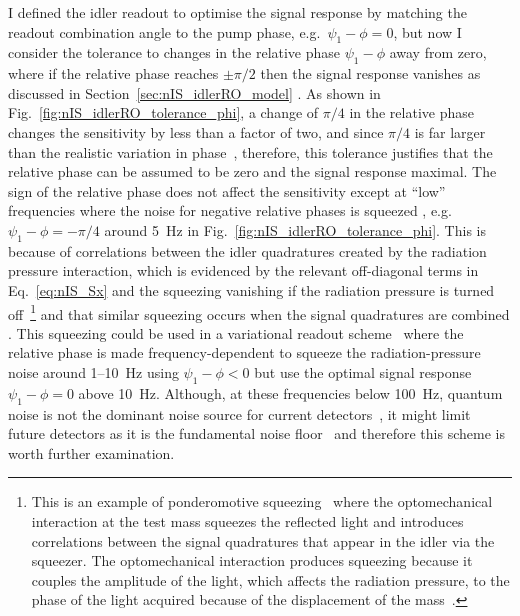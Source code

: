 I defined the idler readout to optimise the signal response by matching the readout combination angle to the pump phase, e.g.\ $\psi_1-\phi=0$, but now I consider the tolerance to changes in the relative phase $\psi_1-\phi$ away from zero, where if the relative phase reaches $\pm\pi/2$ then the signal response vanishes as discussed in Section~\ref{sec:nIS_idlerRO_model} .
As shown in Fig.~\ref{fig:nIS_idlerRO_tolerance_phi}, a change of $\pi/4$ in the relative phase changes the sensitivity by less than a factor of two, and since $\pi/4$ is far larger than the realistic variation in phase~\cite{}, therefore, this tolerance justifies that the relative phase can be assumed to be zero and the signal response maximal. %
The sign of the relative phase does not affect the sensitivity except at ``low'' frequencies where the noise for negative relative phases is squeezed , e.g.\ $\psi_1-\phi=-\pi/4$ around 5~Hz in Fig.~\ref{fig:nIS_idlerRO_tolerance_phi}. This is because of correlations between the idler quadratures created by the radiation pressure interaction, which is evidenced by the relevant off-diagonal terms in Eq.~\ref{eq:nIS_Sx} and the squeezing vanishing if the radiation pressure is turned off~\footnote{This is an example of ponderomotive squeezing~\cite{} where the optomechanical interaction at the test mass squeezes the reflected light and introduces correlations between the signal quadratures that appear in the idler via the squeezer. The optomechanical interaction produces squeezing because it couples the amplitude of the light, which affects the radiation pressure, to the phase of the light acquired because of the displacement of the mass~\cite{}. } and that similar squeezing occurs when the signal quadratures are combined .
This squeezing could be used in a variational readout scheme~\cite{MiaoCQC?} where the relative phase is made frequency-dependent to squeeze the radiation-pressure noise around 1--10~Hz using $\psi_1-\phi<0$ but use the optimal signal response $\psi_1-\phi=0$ above 10~Hz. Although, at these frequencies below 100~Hz, quantum noise is not the dominant noise source for current detectors~\cite{}, it might limit future detectors as it is the fundamental noise floor~\cite{} and therefore this scheme is worth further examination.
